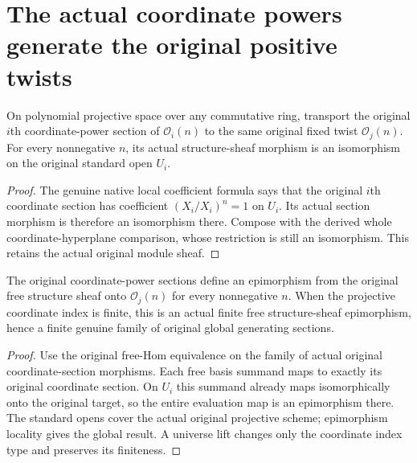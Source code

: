 \section{The actual coordinate powers generate the original positive twists}

\begin{lemma}
\label{lem:coherent-projective-coordinate-power-frames}
\leanok
On polynomial projective space over any commutative ring, transport the
original $i$th coordinate-power section of $\mathcal O_i(n)$ to the same
original fixed twist $\mathcal O_j(n)$. For every nonnegative $n$, its
actual structure-sheaf morphism is an isomorphism on the original standard
open $U_i$.
\end{lemma}
\begin{proof}
The genuine native local coefficient formula says that the original
$i$th coordinate section has coefficient $(X_i/X_i)^n=1$ on $U_i$.
Its actual section morphism is therefore an isomorphism there. Compose
with the derived whole coordinate-hyperplane comparison, whose restriction
is still an isomorphism. This retains the actual original module sheaf.
\end{proof}

\begin{theorem}
\label{thm:coherent-projective-nonnegative-twist-global-generation}
\leanok
The original coordinate-power sections define an epimorphism from the
original free structure sheaf onto $\mathcal O_j(n)$ for every nonnegative
$n$. When the projective coordinate index is finite, this is an actual
finite free structure-sheaf epimorphism, hence a finite genuine family
of original global generating sections.
\end{theorem}
\begin{proof}
Use the original free-Hom equivalence on the family of actual original
coordinate-section morphisms. Each free basis summand maps to exactly its
original coordinate section. On $U_i$ this summand already maps
isomorphically onto the original target, so the entire evaluation map is
an epimorphism there. The standard opens cover the actual original
projective scheme; epimorphism locality gives the global result. A universe
lift changes only the coordinate index type and preserves its finiteness.
\end{proof}

